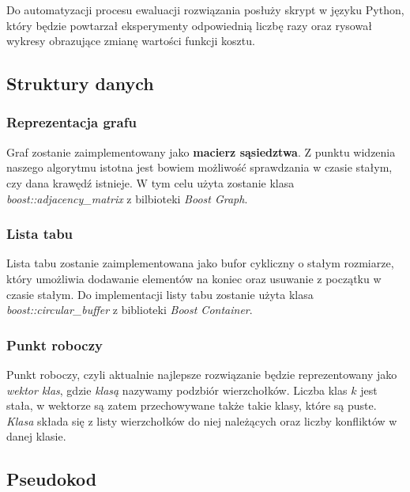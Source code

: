 \documentclass[12pt,a4paper]{article}
\begin{document}
Do automatyzacji procesu ewaluacji rozwiązania posłuży skrypt w języku Python, który będzie powtarzał eksperymenty odpowiednią liczbę razy oraz rysował wykresy obrazujące zmianę wartości funkcji kosztu.

\subsection{Struktury danych}
\subsubsection{Reprezentacja grafu}
Graf zostanie zaimplementowany jako \textbf{macierz sąsiedztwa}. Z punktu widzenia naszego algorytmu istotna jest bowiem możliwość sprawdzania w czasie stałym, czy dana krawędź istnieje. W tym celu użyta zostanie klasa \textit{boost::adjacency\_matrix} z bilbioteki \textit{Boost Graph}.

\subsubsection{Lista tabu}
Lista tabu zostanie zaimplementowana jako bufor cykliczny o stałym rozmiarze, który umożliwia dodawanie elementów na koniec oraz usuwanie z początku w czasie stałym. Do implementacji listy tabu zostanie użyta klasa \textit{boost::circular\_buffer} z biblioteki \textit{Boost Container}.

\subsubsection{Punkt roboczy}
Punkt roboczy, czyli aktualnie najlepsze rozwiązanie będzie reprezentowany jako \textit{wektor klas}, gdzie \textit{klasą} nazywamy podzbiór wierzchołków. Liczba klas $k$ jest stała, w wektorze są zatem przechowywane także takie klasy, które są puste. \textit{Klasa} składa się z listy wierzchołków do niej należących oraz liczby konfliktów w danej klasie.

\newpage
\subsection{Pseudokod}
\label{ssec:pseudo}
\end{document}
